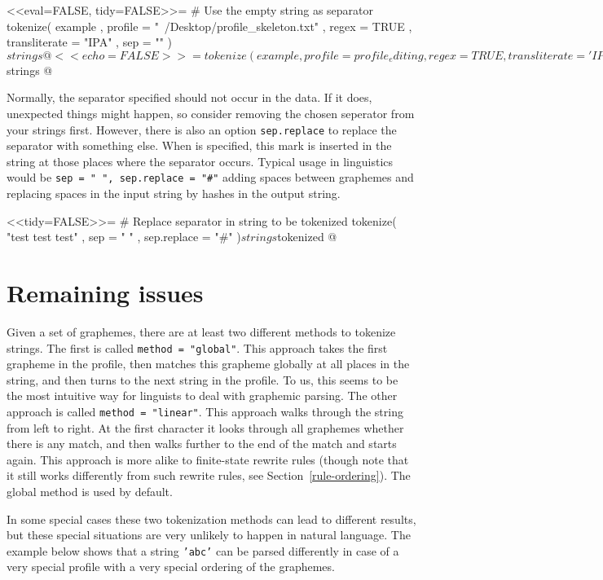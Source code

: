 <<eval=FALSE, tidy=FALSE>>=
# Use the empty string as separator
tokenize( example
         , profile = "~/Desktop/profile_skeleton.txt"
         , regex = TRUE
         , transliterate = "IPA"
         , sep = ""
        )$strings
@

<<echo=FALSE>>=
tokenize(example
  , profile = profile_editing
  , regex = TRUE
  , transliterate = 'IPA'
  , sep = ''
  )$strings
@

Normally, the separator specified should not occur in the data. If it does,
unexpected things might happen, so consider removing the chosen seperator from
your strings first. However, there is also an option \texttt{sep.replace} to
replace the separator with something else. When  is specified,
this mark is inserted in the string at those places where the separator occurs.
Typical usage in linguistics would be \texttt{sep = " ", sep.replace = "\#"} adding
spaces between graphemes and replacing spaces in the input string by hashes in
the output string.

<<tidy=FALSE>>=
# Replace separator in string to be tokenized
tokenize( "test test test"
         , sep = " "
         , sep.replace = "#"
        )$strings$tokenized
@

\section{Remaining issues}

Given a set of graphemes, there are at least two different methods to tokenize
strings. The first is called \texttt{method = "global"}. This approach
takes the first grapheme in the profile, then matches this grapheme globally at
all places in the string, and then turns to the next string in the profile. To
us, this seems to be the most intuitive way for linguists to deal with graphemic
parsing. The other approach is called \texttt{method = "linear"}. This
approach walks through the string from left to right. At the first character it
looks through all graphemes whether there is any match, and then walks further
to the end of the match and starts again. This approach is more alike to
finite-state rewrite rules (though note that it still works differently from
such rewrite rules, see Section~\ref{rule-ordering}). The global method is used 
by default.

In some special cases these two tokenization methods can lead to different
results, but these special situations are very unlikely to happen in natural
language. The example below shows that a string \texttt{'abc'} can be parsed
differently in case of a very special profile with a very special ordering of
the graphemes.

